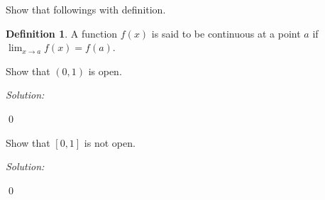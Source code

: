 \documentclass[12pt]{article}
\theoremstyle{definition}
\newtheorem{definition}{Definition}
\newenvironment{problem}[2][Problem]{\begin{trivlist}
\item[\hskip \labelsep {\bfseries #1}\hskip \labelsep {\bfseries #2.}]}{\end{trivlist}}
\newenvironment{sol}
{\emph{Solution:}
}
{
    \qed
    }
\begin{document}




Show that followings with definition.
\begin{definition}
    A function $f(x)$ is said to be continuous at a point $a$ if $\lim_{x\to a} f(x) = f(a)$.
\end{definition}
\begin{problem}{1} 
    Show that $(0,1)$ is open.
\end{problem}

\begin{sol}
\end{sol}

\begin{problem}{2}
    Show that $[0,1]$ is not open.
\end{problem}

\begin{sol}

\end{sol}






\end{document}
